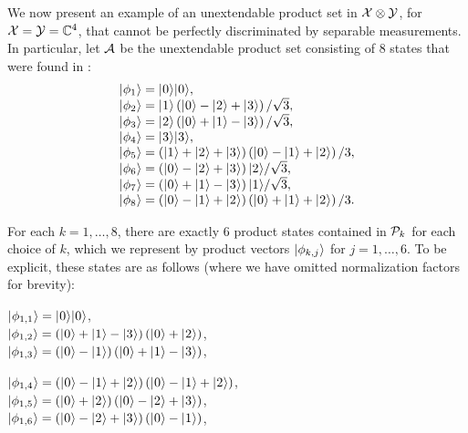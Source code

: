 \begin{example}
We now present an example of an unextendable product set in $\X\otimes\Y$,
for $\X = \Y = \complex^4$, that cannot be perfectly discriminated by separable
measurements. 
In particular, let $\A$ be the unextendable product set consisting of $8$
states that were found in \cite{Feng06}:
\begin{equation}
  \begin{array}{l}
    \ket{\phi_1} = \ket{0}\ket{0}, \\
    \ket{\phi_2} = \ket{1}\left(\ket{0} - \ket{2} + \ket{3}\right)/\sqrt{3},\\
    \ket{\phi_3} = \ket{2}\left(\ket{0} + \ket{1} - \ket{3}\right)/\sqrt{3}, \\
    \ket{\phi_4} = \ket{3}\ket{3}, \\
    \ket{\phi_5} = \left(\ket{1} + \ket{2} + \ket{3}\right)\left(\ket{0}
    - \ket{1} + \ket{2}\right)/3, \\
    \ket{\phi_6} = \left(\ket{0} - \ket{2} + \ket{3}\right)\ket{2}/\sqrt{3}, \\
    \ket{\phi_7} = \left(\ket{0} + \ket{1} - \ket{3}\right)\ket{1}/\sqrt{3}, \\
    \ket{\phi_8} = \left(\ket{0} - \ket{1} + \ket{2}\right)\left(\ket{0}
    + \ket{1} + \ket{2}\right)/3.
  \end{array}
\end{equation}

For each $k = 1, \ldots, 8$, there are exactly $6$ product states contained in
$\P_k$ for each choice of $k$, which we represent by product vectors
$\ket{\phi_{k,j}}$ for $j = 1, \ldots, 6$.
To be explicit, these states are as follows (where we have omitted
normalization factors for brevity):\vspace{3mm}

\noindent\hspace{8pt}
\begin{minipage}{0.48\textwidth}
  $\ket{\phi_{1,1}} = \ket{0}\ket{0}$,\\
  $\ket{\phi_{1,2}} = \left(\ket{0} + \ket{1} - \ket{3}\right)
  \left(\ket{0} + \ket{2}\right)$,\\
  $\ket{\phi_{1,3}} = \left(\ket{0} - \ket{1}\right)
  \left(\ket{0} + \ket{1} - \ket{3}\right)$,
\end{minipage}\hfill
\begin{minipage}{0.48\textwidth}
  $\ket{\phi_{1,4}} = \left(\ket{0} - \ket{1} + 
  \ket{2}\right)\left(\ket{0} - \ket{1} + \ket{2}\right)$, \\
  $\ket{\phi_{1,5}} = \left(\ket{0} + \ket{2}\right)
  \left(\ket{0} - \ket{2} + \ket{3}\right)$,\\
  $\ket{\phi_{1,6}} = \left(\ket{0} - \ket{2} + \ket{3}\right)
  \left(\ket{0} - \ket{1}\right)$,
\end{minipage}


\end{example}
